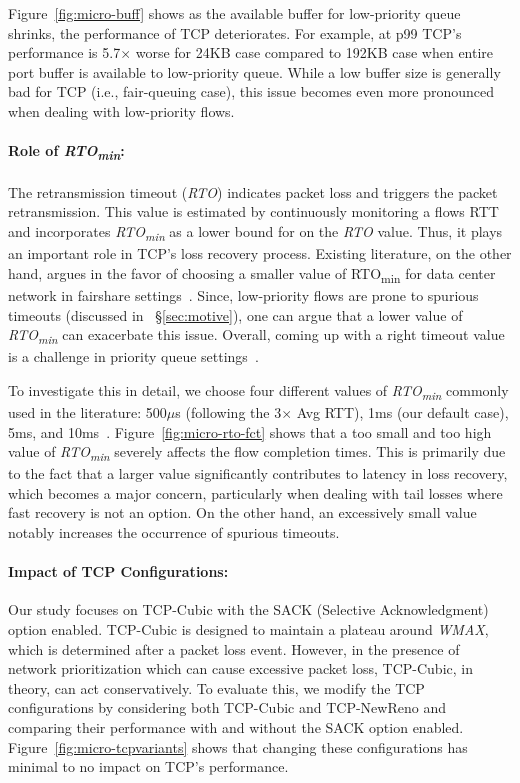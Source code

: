 Figure~\ref{fig:micro-buff} shows as the available buffer for low-priority queue shrinks, the performance of TCP deteriorates. 
For example, at p99 TCP's performance is 5.7$\times$ worse for 24KB case compared to 192KB case when entire port buffer is available to low-priority queue.
While a low buffer size is generally bad for TCP (i.e., fair-queuing case), this issue becomes even more pronounced when dealing with low-priority flows.

\paragraph{\textbf{Role of \textit{RTO\textsubscript{min}}:}}
The retransmission timeout (\emph{RTO}) indicates packet loss and triggers the packet retransmission. This value is estimated by continuously monitoring a flows RTT and incorporates \emph{RTO\textsubscript{min}} as a lower bound for on the \emph{RTO} value. Thus, it plays an important role in TCP's loss recovery process. Existing literature, on the other hand, argues in the favor of choosing a smaller value of RTO\textsubscript{min} for data center network in fairshare settings~\cite{hrtimer-sigcomm09,pfabric,fastlane,annulus,ndp}. Since, low-priority flows are prone to spurious timeouts (discussed in ~\S\ref{sec:motive}), one can argue that a lower value of \emph{RTO\textsubscript{min}} can exacerbate this issue. Overall, coming up with a right timeout value is a challenge in priority queue settings~\cite{aeolus}.

To investigate this in detail, we choose four different values of \emph{RTO\textsubscript{min}} commonly used in the literature: 500$\mu$s (following the 3$\times$ Avg RTT), 1ms (our default case), 5ms, and 10ms~\cite{dctcp,annulus,ndp}.
Figure~\ref{fig:micro-rto-fct} shows that a too small and too high value of \textit{RTO\textsubscript{min}} severely affects the flow completion times. This is primarily due to the fact that a larger value significantly contributes to latency in loss recovery, which becomes a major concern, particularly when dealing with tail losses where fast recovery is not an option. On the other hand, an excessively small value notably increases the occurrence of spurious timeouts.


\paragraph{\textbf{Impact of TCP Configurations:}}
Our study focuses on TCP-Cubic with the SACK (Selective Acknowledgment) option enabled. TCP-Cubic is designed to maintain a plateau around \emph{WMAX}, which is determined after a packet loss event. However, in the presence of network prioritization which can cause excessive packet loss, TCP-Cubic, in theory, can act conservatively.
To evaluate this, we modify the TCP configurations by considering both TCP-Cubic and TCP-NewReno and comparing their performance with and without the SACK option enabled.
Figure~\ref{fig:micro-tcpvariants} shows that changing these configurations has minimal to no impact on TCP's performance.



